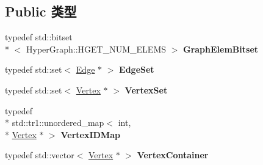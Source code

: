 \subsection*{Public 类型}
\begin{DoxyCompactItemize}
\item 
\hypertarget{classg2o_1_1HyperGraph_a7b8fda20e1b03e92aeceeac6e8218b73}{typedef std\-::bitset\\*
$<$ Hyper\-Graph\-::\-H\-G\-E\-T\-\_\-\-N\-U\-M\-\_\-\-E\-L\-E\-M\-S $>$ {\bfseries Graph\-Elem\-Bitset}}\label{classg2o_1_1HyperGraph_a7b8fda20e1b03e92aeceeac6e8218b73}

\item 
\hypertarget{classg2o_1_1HyperGraph_a5e2970e236c0dcb4eff7c205d7b6b4ae}{typedef std\-::set$<$ \hyperlink{classg2o_1_1HyperGraph_1_1Edge}{Edge} $\ast$ $>$ {\bfseries Edge\-Set}}\label{classg2o_1_1HyperGraph_a5e2970e236c0dcb4eff7c205d7b6b4ae}

\item 
\hypertarget{classg2o_1_1HyperGraph_a703938cdb4bb636860eed55a2489d70c}{typedef std\-::set$<$ \hyperlink{classg2o_1_1HyperGraph_1_1Vertex}{Vertex} $\ast$ $>$ {\bfseries Vertex\-Set}}\label{classg2o_1_1HyperGraph_a703938cdb4bb636860eed55a2489d70c}

\item 
\hypertarget{classg2o_1_1HyperGraph_a97307eac064ebf4b3e2cfbf0718035b5}{typedef \\*
std\-::tr1\-::unordered\-\_\-map$<$ int, \\*
\hyperlink{classg2o_1_1HyperGraph_1_1Vertex}{Vertex} $\ast$ $>$ {\bfseries Vertex\-I\-D\-Map}}\label{classg2o_1_1HyperGraph_a97307eac064ebf4b3e2cfbf0718035b5}

\item 
\hypertarget{classg2o_1_1HyperGraph_a9339534c99300a0ddac87ba976ef188c}{typedef std\-::vector$<$ \hyperlink{classg2o_1_1HyperGraph_1_1Vertex}{Vertex} $\ast$ $>$ {\bfseries Vertex\-Container}}\label{classg2o_1_1HyperGraph_a9339534c99300a0ddac87ba976ef188c}

\end{DoxyCompactItemize}
